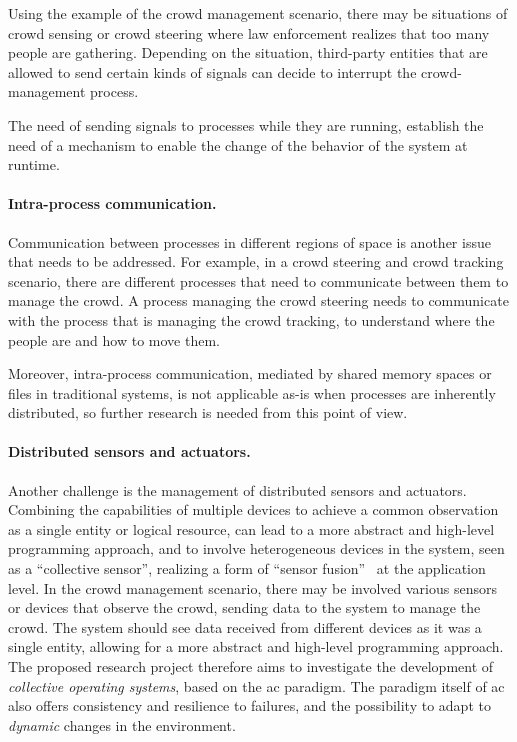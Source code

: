 \documentclass[12pt, a4paper]{article}
\begin{document}
Using the example of the crowd management scenario,
there may be situations of crowd sensing or crowd steering where law enforcement realizes that too many people are gathering.
%
Depending on the situation,
third-party entities that are allowed to send certain kinds of signals can decide to interrupt the crowd-management process.

The need of sending signals to processes while they are running,
establish the need of a mechanism to enable the change of the behavior of the system at runtime.

\paragraph{Intra-process communication.}
Communication between processes in different regions of space is another issue that needs to be addressed.
%
For example,
in a crowd steering and crowd tracking scenario,
there are different processes that need to communicate between them to manage the crowd.
%
A process managing the crowd steering needs to communicate with the process that is managing the crowd tracking,
to understand where the people are and how to move them.

Moreover, intra-process communication,
mediated by shared memory spaces or files in traditional systems,
is not applicable as-is when processes are inherently distributed,
so further research is needed from this point of view.

\paragraph{Distributed sensors and actuators.}
Another challenge is the management of distributed sensors and actuators.
%
Combining the capabilities of multiple devices to achieve a common observation as a single entity or logical resource,
can lead to a more abstract and high-level programming approach,
and to involve heterogeneous devices in the system,
seen as a ``collective sensor'',
realizing a form of ``sensor fusion''~\cite{sasiadek2002sensor} at the application level.
%
In the crowd management scenario,
there may be involved various sensors or devices that observe the crowd,
sending data to the system to manage the crowd.
%
The system should see data received from different devices as it was a single entity,
allowing for a more abstract and high-level programming approach.
\\

The proposed research project therefore aims to investigate the development of \emph{collective operating systems},
based on the \ac{ac} paradigm.
%
The paradigm itself of \ac{ac} also offers consistency and resilience to failures,
and the possibility to adapt to \emph{dynamic} changes in the environment.
\end{document}
